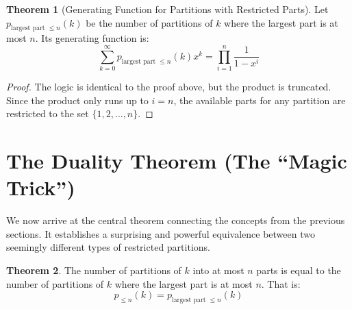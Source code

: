 \documentclass{article}
\theoremstyle{definition}
\newtheorem{theorem}{Theorem}
\begin{document}
\begin{theorem}[Generating Function for Partitions with Restricted Parts]
  Let $p_{\text{largest part } \le n}(k)$ be the number of partitions of $k$ where the largest part is at most $n$. Its generating function is:
  $$ \sum_{k=0}^{\infty} p_{\text{largest part } \le n}(k)x^k = \prod_{i=1}^{n} \frac{1}{1-x^i} $$
\end{theorem}
\begin{proof}
  The logic is identical to the proof above, but the product is truncated. Since the product only runs up to $i=n$, the available parts for any partition are restricted to the set $\{1, 2, \dots, n\}$.
\end{proof}


\section{The Duality Theorem (The ``Magic Trick'')}

We now arrive at the central theorem connecting the concepts from the previous sections. It establishes a surprising and powerful equivalence between two seemingly different types of restricted partitions.

\begin{theorem}\label{thm:duality}
  The number of partitions of $k$ into at most $n$ parts is equal to the number of partitions of $k$ where the largest part is at most $n$. That is:
  $$ p_{\le n}(k) = p_{\text{largest part } \le n}(k) $$
\end{theorem}
\end{document}
